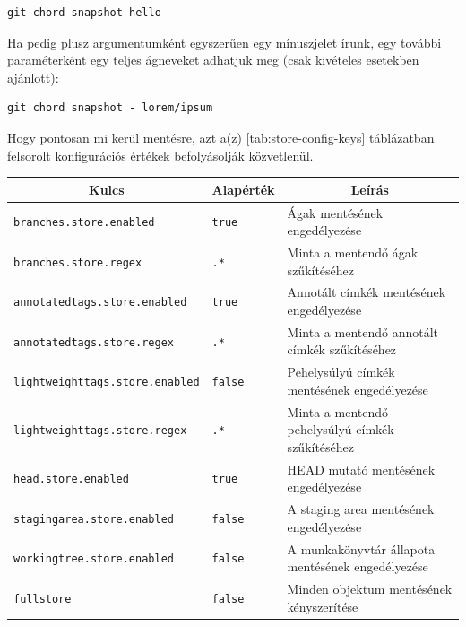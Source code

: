 \documentclass[
]{elteikthesis}[2025/03/25]
\begin{document}
\begin{verbatim}
git chord snapshot hello
\end{verbatim}

Ha pedig plusz argumentumként egyszerűen egy mínuszjelet írunk,
egy további paraméterként egy teljes ágneveket adhatjuk meg (csak kivételes esetekben ajánlott):

\begin{verbatim}
git chord snapshot - lorem/ipsum
\end{verbatim}

Hogy pontosan mi kerül mentésre, azt a(z) \ref{tab:store-config-keys} táblázatban felsorolt
konfigurációs értékek befolyásolják közvetlenül.

\begin{table}[h]
\captionsetup{justification=justified, singlelinecheck=false}
\begin{center}
\begin{tabular}{|l|l|p{5cm}|} 
 \hline
 \multicolumn{1}{|c}{\textbf{Kulcs}} &
 \multicolumn{1}{|c}{\textbf{Alapérték}} &
 \multicolumn{1}{|c|}{\textbf{Leírás}} \\
 \hline\hline
 
 \texttt{branches.store.enabled} & \texttt{true} & Ágak mentésének engedélyezése\vspace{0.5em} \\
 \texttt{branches.store.regex} & \texttt{.*} & Minta a mentendő ágak szűkítéséhez\vspace{0.5em} \\
 \texttt{annotatedtags.store.enabled} & \texttt{true} & Annotált címkék mentésének engedélyezése\vspace{0.5em} \\
 \texttt{annotatedtags.store.regex} & \texttt{.*} & Minta a mentendő annotált címkék szűkítéséhez\vspace{0.5em} \\
 \texttt{lightweighttags.store.enabled} & \texttt{false} & Pehelysúlyú címkék mentésének engedélyezése\vspace{0.5em} \\
 \texttt{lightweighttags.store.regex} & \texttt{.*} & Minta a mentendő pehelysúlyú címkék szűkítéséhez\vspace{0.5em} \\
 \texttt{head.store.enabled} & \texttt{true} & HEAD mutató mentésének engedélyezése\vspace{0.5em} \\
 \texttt{stagingarea.store.enabled} & \texttt{false} & A staging area mentésének engedélyezése\vspace{0.5em} \\
 \texttt{workingtree.store.enabled} & \texttt{false} & A munkakönyvtár állapota mentésének engedélyezése\vspace{0.5em} \\
 \texttt{fullstore} & \texttt{false} & Minden objektum mentésének kényszerítése \\
 

\end{tabular}
\end{center}
\end{table}
\end{document}
